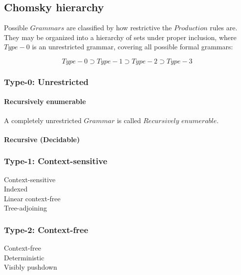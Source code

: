 \documentclass{article}
\begin{document}
\subsection{Chomsky hierarchy}

Possible $Grammars$ are classified by how restrictive the $Production$
rules are. They may be organized into a hierarchy of sets under proper
inclusion, where $Type-0$ is an unrestricted grammar, covering all
possible formal grammars:

\[
    Type-0 \supset Type-1 \supset Type-2 \supset Type-3
\]

\subsubsection{Type-0: Unrestricted}

    \paragraph{Recursively enumerable}
    A completely unrestricted $Grammar$ is called $Recursively$ $enumerable$.

    \paragraph{Recursive (Decidable)}

\subsubsection{Type-1: Context-sensitive}

    \begin{description}

    \item[Context-sensitive]

    \item[Indexed]

    \item[Linear context-free]

    \item[Tree-adjoining]

    \end{description}

\subsubsection{Type-2: Context-free}

    \begin{description}

    \item[Context-free]

    \item[Deterministic]

    \item[Visibly pushdown]

    \end{description}
\end{document}
